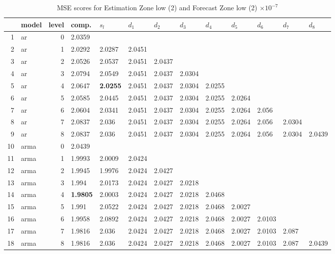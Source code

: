 \documentclass[10pt,a4paper]{article}
\begin{document}
\begin{table}[ht]
\centering
\caption{MSE scores for Estimation Zone low (2) and Forecast Zone low (2) $ \times 10^{-7}$} 
\begin{tabular}{rlrllllllllll}
  \hline
 & model & level & comp. & $s_l$ & $d_1$ & $d_2$ & $d_3$ & $d_4$ & $d_5$ & $d_6$ & $d_7$ & $d_8$ \\ 
  \hline
1 & ar &     0 & 2.0359 &  &  &  &  &  &  &  &  &  \\ 
  2 & ar &     1 & 2.0292 & 2.0287 & 2.0451 &  &  &  &  &  &  &  \\ 
  3 & ar &     2 & 2.0526 & 2.0537 & 2.0451 & 2.0437 &  &  &  &  &  &  \\ 
  4 & ar &     3 & 2.0794 & 2.0549 & 2.0451 & 2.0437 & 2.0304 &  &  &  &  &  \\ 
  5 & ar &     4 & 2.0647 & \textbf{2.0255} & 2.0451 & 2.0437 & 2.0304 & 2.0255 &  &  &  &  \\ 
  6 & ar &     5 & 2.0585 & 2.0445 & 2.0451 & 2.0437 & 2.0304 & 2.0255 & 2.0264 &  &  &  \\ 
  7 & ar &     6 & 2.0604 & 2.0341 & 2.0451 & 2.0437 & 2.0304 & 2.0255 & 2.0264 & 2.056 &  &  \\ 
  8 & ar &     7 & 2.0837 & 2.036 & 2.0451 & 2.0437 & 2.0304 & 2.0255 & 2.0264 & 2.056 & 2.0304 &  \\ 
  9 & ar &     8 & 2.0837 & 2.036 & 2.0451 & 2.0437 & 2.0304 & 2.0255 & 2.0264 & 2.056 & 2.0304 & 2.0439 \\ 
   \hline
10 & arma &     0 & 2.0439 &  &  &  &  &  &  &  &  &  \\ 
  11 & arma &     1 & 1.9993 & 2.0009 & 2.0424 &  &  &  &  &  &  &  \\ 
  12 & arma &     2 & 1.9945 & 1.9976 & 2.0424 & 2.0427 &  &  &  &  &  &  \\ 
  13 & arma &     3 & 1.994 & 2.0173 & 2.0424 & 2.0427 & 2.0218 &  &  &  &  &  \\ 
  14 & arma &     4 & \textbf{1.9805} & 2.0003 & 2.0424 & 2.0427 & 2.0218 & 2.0468 &  &  &  &  \\ 
  15 & arma &     5 & 1.991 & 2.0522 & 2.0424 & 2.0427 & 2.0218 & 2.0468 & 2.0027 &  &  &  \\ 
  16 & arma &     6 & 1.9958 & 2.0892 & 2.0424 & 2.0427 & 2.0218 & 2.0468 & 2.0027 & 2.0103 &  &  \\ 
  17 & arma &     7 & 1.9816 & 2.036 & 2.0424 & 2.0427 & 2.0218 & 2.0468 & 2.0027 & 2.0103 & 2.087 &  \\ 
  18 & arma &     8 & 1.9816 & 2.036 & 2.0424 & 2.0427 & 2.0218 & 2.0468 & 2.0027 & 2.0103 & 2.087 & 2.0439 \\ 

\end{tabular}
\end{table}
\end{document}
